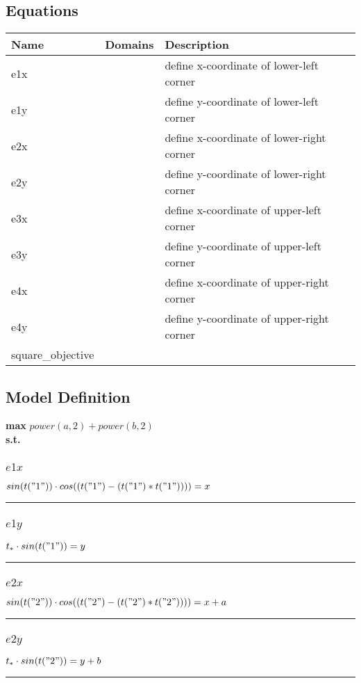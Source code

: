 \documentclass[11pt]{article}
\begin{document}
\subsection*{Equations}
\begin{tabularx}{\textwidth}{| l | l | X |}
\hline
\textbf{Name} & \textbf{Domains} & \textbf{Description}\\
\hline
\endhead

e1x &  & define x-coordinate of lower-left corner\\
e1y &  & define y-coordinate of lower-left corner\\
e2x &  & define x-coordinate of lower-right corner\\
e2y &  & define y-coordinate of lower-right corner\\
e3x &  & define x-coordinate of upper-left corner\\
e3y &  & define y-coordinate of upper-left corner\\
e4x &  & define x-coordinate of upper-right corner\\
e4y &  & define y-coordinate of upper-right corner\\
square\_objective &  & \\
\hline
\end{tabularx}
\subsection*{Model Definition}
\textbf{max} $ power(a,2)  +  power(b,2) $\\
\textbf{s.t.}
\subsubsection*{$e1x$}
$
 sin(t("1"))  \cdot  cos((t("1") - (t("1") * t("1"))))  = x
$
\vspace{5pt}
\hrule
\subsubsection*{$e1y$}
$
t_{*} \cdot  sin(t("1"))  = y
$
\vspace{5pt}
\hrule
\subsubsection*{$e2x$}
$
 sin(t("2"))  \cdot  cos((t("2") - (t("2") * t("2"))))  = x + a
$
\vspace{5pt}
\hrule
\subsubsection*{$e2y$}
$
t_{*} \cdot  sin(t("2"))  = y + b
$
\vspace{5pt}
\hrule
\end{document}

